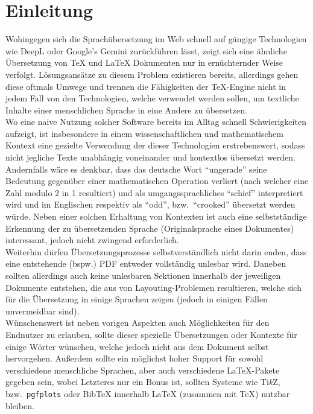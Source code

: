 \section{Einleitung}
Wohingegen sich die Sprachübersetzung im Web schnell auf gängige Technologien wie DeepL oder Google's Gemini zurückführen lässt, zeigt sich eine ähnliche Übersetzung von \TeX{} und \LaTeX{} Dokumenten nur in ernüchternder Weise verfolgt. Lösungsansätze zu diesem Problem existieren bereits, allerdings gehen diese oftmals Umwege und trennen die Fähigkeiten der \TeX{}-Engine nicht in jedem Fall von den Technologien, welche verwendet werden sollen, um textliche Inhalte einer menschlichen Sprache in eine Andere zu übersetzen.\\
\noindent
Wo eine naive Nutzung solcher Software bereits im Alltag schnell Schwierigkeiten aufzeigt, ist insbesondere in einem wissenschaftlichen und mathematischem Kontext eine gezielte Verwendung der dieser Technologien erstrebenswert, sodass nicht jegliche Texte unabhängig voneinander und kontextlos übersetzt werden. Andernfalls wäre es denkbar, dass das deutsche Wort \enquote{ungerade} seine Bedeutung gegenüber einer mathematischen Operation verliert (nach welcher eine Zahl modulo 2 in 1 resultiert) und als umgangssprachliches \enquote{schief} interpretiert wird und im Englischen respektiv als \enquote{odd}, bzw.\ \enquote{crooked} übersetzt werden würde. Neben einer solchen Erhaltung von Kontexten ist auch eine selbstständige Erkennung der zu übersetzenden Sprache (Originalsprache eines Dokumentes) interessant, jedoch nicht zwingend erforderlich.\\
\noindent
Weiterhin dürfen Übersetzungsprozesse selbstverständlich nicht darin enden, dass eine entstehende (bspw.) PDF entweder vollständig unlesbar wird. %
Daneben sollten allerdings auch keine unlesbaren Sektionen innerhalb der jeweiligen Dokumente entstehen, die aus von Layouting-Problemen resultieren, welche sich für die Übersetzung in einige Sprachen zeigen (jedoch in einigen Fällen unvermeidbar sind).\\ 
\noindent
Wünschenswert ist neben vorigen Aspekten auch Möglichkeiten für den Endnutzer zu erlauben, sollte dieser spezielle Übersetzungen oder Kontexte für einige Wörter wünschen, welche jedoch nicht aus dem Dokument selbst hervorgehen. %
Außerdem sollte ein möglichst hoher Support für sowohl verschiedene menschliche Sprachen, aber auch verschiedene \LaTeX{}-Pakete gegeben sein, wobei Letzteres nur ein Bonus ist, sollten Systeme wie Ti\textit{k}Z, bzw.\ \texttt{pgfplots} oder Bib\TeX{} innerhalb \LaTeX{} (zusammen mit \TeX{}) nutzbar bleiben.%